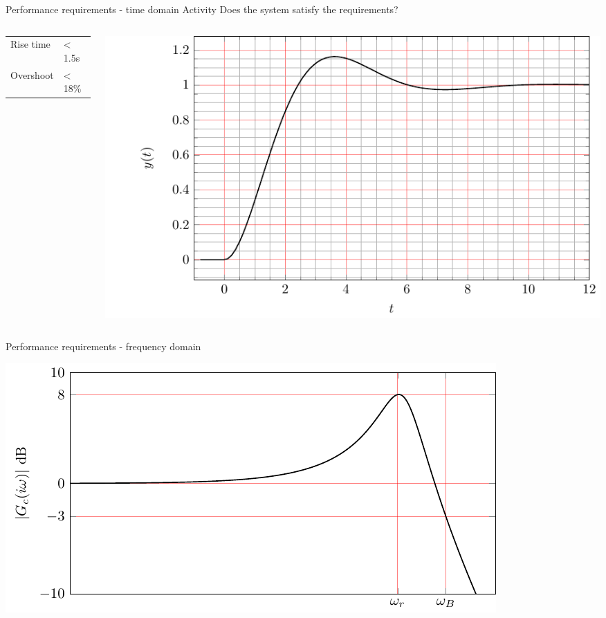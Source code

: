 \documentclass[presentation,aspectratio=169, usenames, dvipsnames]{beamer}
\begin{document}
\begin{frame}[label={sec:org704aa58}]{Performance requirements - time domain}
\alert{Activity} Does the system satisfy the requirements?

\begin{columns}
\begin{column}{0.3\columnwidth}
\begin{center}
\begin{tabular}{ll}
Rise time & < 1.5s\\
Overshoot & < 18\%\\
\end{tabular}
\end{center}
\end{column}


\begin{column}{0.7\columnwidth}
\begin{center}
 \includegraphics[width=1.0\linewidth]{../../figures/second-order-response-example}
\end{center}
\end{column}
\end{columns}
\end{frame}
\begin{frame}[label={sec:orge5710ca}]{Performance requirements - frequency domain}
\begin{center}
  \includegraphics[width=.8\linewidth]{../../figures/spec-bode-closed-loop-new}
\end{center}
\end{frame}
\end{document}
